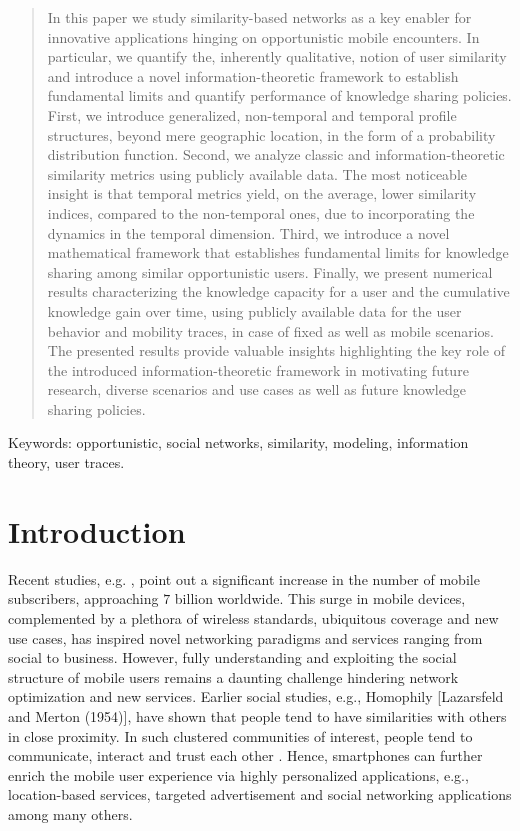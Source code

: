 \documentclass[conference]{IEEEtran}
\theoremstyle{definition}
\begin{document}
\vspace{-0.5 cm}
\begin{abstract}
In this paper we study similarity-based networks as a key enabler 
for innovative applications hinging on opportunistic mobile 
encounters. In particular, we quantify the, inherently qualitative, 
notion of user similarity and introduce a novel information-theoretic 
framework to establish fundamental limits and quantify performance of knowledge 
sharing policies. First, we introduce generalized, non-temporal and 
temporal profile structures, beyond mere geographic location, in the form of 
a probability distribution function. Second, we analyze classic and 
information-theoretic similarity metrics using publicly available data. 
The most noticeable insight is that temporal metrics yield, on the average, 
lower similarity indices, compared to the non-temporal ones, due to incorporating 
the dynamics in the temporal dimension. Third, we introduce a novel 
mathematical framework that establishes fundamental limits for knowledge sharing 
among similar opportunistic users. Finally, 
we present numerical results characterizing the knowledge capacity for a 
user and the cumulative knowledge gain over time, using publicly available 
data for the user behavior and mobility traces, in case of fixed 
as well as mobile scenarios. The presented results provide valuable insights 
highlighting the key role of the introduced information-theoretic 
framework in motivating future research, diverse scenarios and use cases as 
well as future knowledge sharing policies.
\end{abstract}

\noindent Keywords: opportunistic, social networks, similarity, modeling, information theory, user traces.
\vspace{-0.7 cm}
\section{Introduction}
\vspace{-0.4 cm}
Recent studies, e.g. \cite{itu14}, point out a significant increase
in the number of mobile subscribers, approaching $7$ billion worldwide. 
This surge in mobile devices, complemented by a plethora of wireless 
standards, ubiquitous coverage and new use cases,
has inspired novel networking paradigms and services ranging from
social \cite{Isoc,ga} to business. However, fully understanding
and exploiting the social structure of mobile users remains a daunting
challenge hindering network optimization and new services. Earlier
social studies, e.g., Homophily {[}Lazarsfeld and Merton (1954){]},
have shown that people tend to have similarities with others in close
proximity. In such clustered communities of interest, people tend to 
communicate, interact and trust each other \cite{csi}.
Hence, smartphones can further enrich the mobile user experience
via highly personalized applications, e.g., location-based services,
targeted advertisement and social networking applications among many others. 
\end{document}
